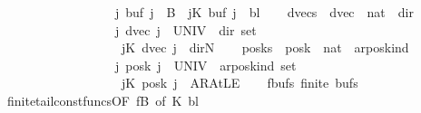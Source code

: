 \begin{isabellebody}
\ \ \ \ \ \ \ \ \ \ \ \ \ \ \ \ \ \ {\isacharparenleft}{\kern0pt}{\isasymforall}j{\isachardot}{\kern0pt}\ buf\ j\ {\isasymin}\ {\isacharquery}{\kern0pt}B{\isacharparenright}{\kern0pt}\ {\isasymand}\ {\isacharparenleft}{\kern0pt}{\isasymforall}j{\isasymge}K{\isachardot}{\kern0pt}\ buf\ j\ {\isacharequal}{\kern0pt}\ bl{\isacharparenright}{\kern0pt}{\isacharbraceright}{\kern0pt}{\isachardoublequoteclose}\isanewline
\ \ \isamarkupfalse%
\ {\isacharquery}{\kern0pt}dvecs\ {\isacharequal}{\kern0pt}\ {\isachardoublequoteopen}{\isacharbraceleft}{\kern0pt}dvec\ {\isacharcolon}{\kern0pt}{\isacharcolon}{\kern0pt}\ nat\ {\isasymRightarrow}\ dir{\isachardot}{\kern0pt}\isanewline
\ \ \ \ \ \ \ \ \ \ \ \ \ \ \ \ \ \ {\isacharparenleft}{\kern0pt}{\isasymforall}j{\isachardot}{\kern0pt}\ dvec\ j\ {\isasymin}\ {\isacharparenleft}{\kern0pt}UNIV\ {\isacharcolon}{\kern0pt}{\isacharcolon}{\kern0pt}\ dir\ set{\isacharparenright}{\kern0pt}{\isacharparenright}{\kern0pt}\isanewline
\ \ \ \ \ \ \ \ \ \ \ \ \ \ \ \ \ \ {\isasymand}\ {\isacharparenleft}{\kern0pt}{\isasymforall}j{\isasymge}K{\isachardot}{\kern0pt}\ dvec\ j\ {\isacharequal}{\kern0pt}\ dir{\isachardot}{\kern0pt}N{\isacharparenright}{\kern0pt}{\isacharbraceright}{\kern0pt}{\isachardoublequoteclose}\isanewline
\ \ \isamarkupfalse%
\ {\isacharquery}{\kern0pt}posks\ {\isacharequal}{\kern0pt}\ {\isachardoublequoteopen}{\isacharbraceleft}{\kern0pt}posk\ {\isacharcolon}{\kern0pt}{\isacharcolon}{\kern0pt}\ nat\ {\isasymRightarrow}\ ar{\isacharunderscore}{\kern0pt}pos{\isacharunderscore}{\kern0pt}kind{\isachardot}{\kern0pt}\isanewline
\ \ \ \ \ \ \ \ \ \ \ \ \ \ \ \ \ \ {\isacharparenleft}{\kern0pt}{\isasymforall}j{\isachardot}{\kern0pt}\ posk\ j\ {\isasymin}\ {\isacharparenleft}{\kern0pt}UNIV\ {\isacharcolon}{\kern0pt}{\isacharcolon}{\kern0pt}\ ar{\isacharunderscore}{\kern0pt}pos{\isacharunderscore}{\kern0pt}kind\ set{\isacharparenright}{\kern0pt}{\isacharparenright}{\kern0pt}\isanewline
\ \ \ \ \ \ \ \ \ \ \ \ \ \ \ \ \ \ {\isasymand}\ {\isacharparenleft}{\kern0pt}{\isasymforall}j{\isasymge}K{\isachardot}{\kern0pt}\ posk\ j\ {\isacharequal}{\kern0pt}\ AR{\isacharunderscore}{\kern0pt}AtLE{\isacharparenright}{\kern0pt}{\isacharbraceright}{\kern0pt}{\isachardoublequoteclose}\isanewline
\ \ \isamarkupfalse%
\ fbufs{\isacharcolon}{\kern0pt}\ {\isachardoublequoteopen}finite\ {\isacharquery}{\kern0pt}bufs{\isachardoublequoteclose}\isanewline
\ \ \ \ \isamarkupfalse%
\ finite{\isacharunderscore}{\kern0pt}tail{\isacharunderscore}{\kern0pt}const{\isacharunderscore}{\kern0pt}funcs{\isacharbrackleft}{\kern0pt}OF\ fB{\isacharcomma}{\kern0pt}\ of\ K\ bl{\isacharbrackright}{\kern0pt}\ \isakeywordONE{{\isachardot}{\kern0pt}}\isamarkupfalse%

\end{isabellebody}
